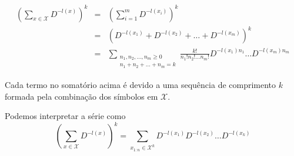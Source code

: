\begin{frame}[allowframebreaks]
\begin{lemma}
  \begin{eqnarray}
  \left( \sum_{x \in \mathcal{X}} D^{-l(x)} \right)^k &=& \left( \sum_{i=1}^{m} D^{-l(x_i)} \right)^k \nonumber \\
		&=& \left( D^{-l(x_1)} + D^{-l(x_2)} + \ldots + D^{-l(x_m)}  \right)^k \nonumber \\
		&=& \sum_{\substack{ n_1, n_2, \ldots, n_m \geq 0 \\ n_1 + n_2 + \ldots + n_m = k}} 
			\frac{k!}{n_1! n_2! \ldots n_m!} D^{-l(x_1)n_1} \ldots D^{-l(x_m)n_m} \nonumber
  \end{eqnarray}
  \lemmabreak

  Cada termo no somatório acima é devido a uma sequência de comprimento $k$ formada pela combinação dos símbolos
  em $\mathcal{X}$. 

  Podemos interpretar a série como 
  \begin{equation}
  \left( \sum_{x \in \mathcal{X}} D^{-l(x)} \right)^k = \sum_{x_{1:n} \in \mathcal{X}^k} D^{-l(x_1)} D^{-l(x_2)} \ldots D^{-l(x_k)} 
  \end{equation}
  \end{lemma}


\end{frame}

